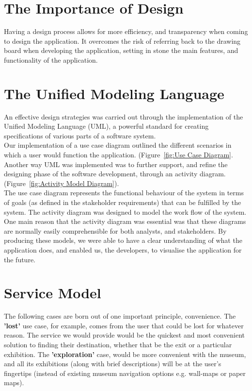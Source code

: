 
\section{The Importance of Design}
Having a design process allows for more efficiency, and transparency when coming to design the application. It overcomes the risk of referring back to the drawing board when developing the application, setting in stone the main features, and functionality of the application.

\section{The Unified Modeling Language}
An effective design strategies was carried out through the implementation of the Unified Modeling Language (UML), a powerful standard for creating specifications of various parts of a software system.\\

Our implementation of a use case diagram outlined the different scenarios in which a user would function the application. (Figure~\ref{fig:Use Case Diagram}. Another way UML was implemented was to further support, and refine the designing phase of the software development, through an activity diagram. (Figure~\ref{fig:Activity Model Diagram}).\\

The use case diagram represents the functional behaviour of the system in terms of goals (as defined in the stakeholder requirements) that can be fulfilled by the system. The activity diagram was designed to model the work flow of the system. One main reason that the activity diagram was essential was that these diagrams are normally easily comprehensible for both analysts, and stakeholders. By producing these models, we were able to have a clear understanding of what the application does, and enabled us, the developers, to visualise the application for the future.

\section{Service Model}
The following cases are born out of one important principle, convenience. The \textbf{'lost'} use case, for example, comes from the user that could be lost for whatever reason. The service we would provide would be the quickest and most convenient solution to finding their destination, whether that be the exit or a particular exhibition. The \textbf{'exploration'} case, would be more convenient with the museum, and all its exhibitions (along with brief descriptions) will be at the user's fingertips (instead of existing museum navigation options e.g. wall-maps or paper maps).

